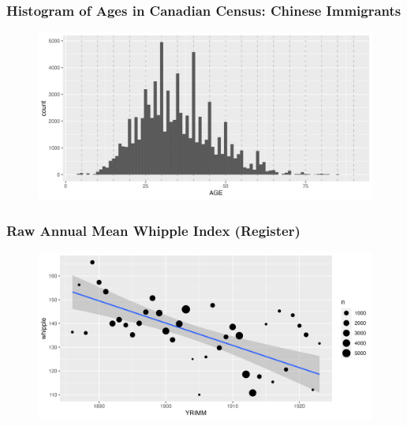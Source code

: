 \documentclass[xcolor=dvipsnames, compress, 12pt, aspectratio=169, handout]{beamer}
\begin{document}
\begin{frame}
    \frametitle{Histogram of Ages in Canadian Census: Chinese Immigrants \hyperlink{whipple}{}}
    \label{agehist}
    \begin{figure}
        \centering
        \includegraphics[width=\textwidth]{../../figs/5oct23/agehist_census.png}
    \end{figure}
\end{frame}

\begin{frame}
    \label{whippleplot1}
    \frametitle{Raw Annual Mean Whipple Index (Register) \hyperlink{whipple}{}}
    \begin{figure}
        \centering
        \includegraphics[width=\textwidth]{../../figs/5oct23/whippleplot1.png}
    \end{figure}
\end{frame}
\end{document}
